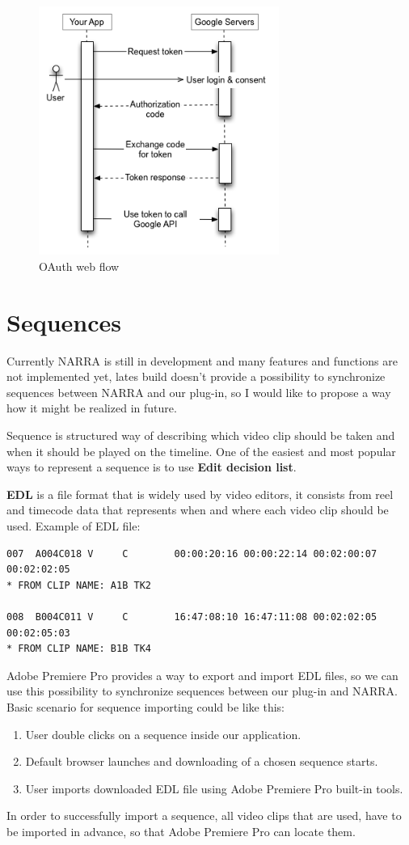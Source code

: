 \documentclass[thesis=B,english]{FITthesis}[2012/10/20]
\begin{document}
	\begin{figure}
		\centering
		\includegraphics[width=0.7\textwidth]{oauthwebflow.png}
		\caption{OAuth web flow}\label{fig:oauth}
	\end{figure}

\section{Sequences}
Currently NARRA is still in development and many features and functions are not implemented yet, lates build doesn't provide a possibility to synchronize sequences between NARRA and our plug-in, so I would like to propose a way how it might be realized in future.

Sequence is structured way of describing which video clip should be taken and when it should be played on the timeline. One of the easiest and most popular ways to represent a sequence is to use \textbf{Edit decision list}.

\textbf{EDL} is a file format that is widely used by video editors, it consists from reel and timecode data that represents when and where each video clip should be used. Example of EDL file:
\begin{lstlisting}[caption=Part of EDL file, label=lst:lst_edl]
007  A004C018 V     C        00:00:20:16 00:00:22:14 00:02:00:07 00:02:02:05
* FROM CLIP NAME: A1B TK2
 
008  B004C011 V     C        16:47:08:10 16:47:11:08 00:02:02:05 00:02:05:03
* FROM CLIP NAME: B1B TK4
\end{lstlisting}
Adobe Premiere Pro provides a way to export and import EDL files, so we can use this possibility to synchronize sequences between our plug-in and NARRA. Basic scenario for sequence importing could be like this:
	\begin{enumerate}
		\item User double clicks on a sequence inside our application.
		\item Default browser launches and downloading of a chosen sequence starts.
		\item User imports downloaded EDL file using Adobe Premiere Pro built-in tools. 
	\end{enumerate}
In order to successfully import a sequence, all video clips that are used, have to be imported in advance, so that Adobe Premiere Pro can locate them.
\end{document}
